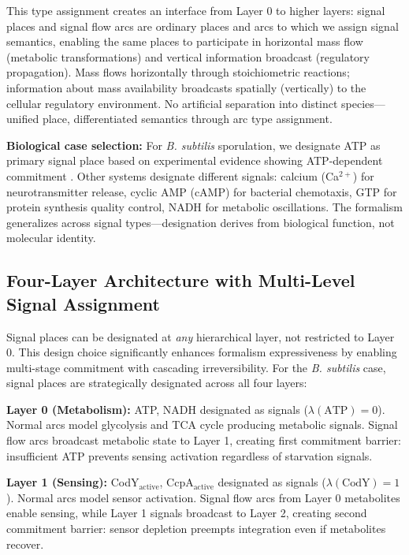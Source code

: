 \documentclass[10pt,letterpaper]{article}
\begin{document}
This type assignment creates an interface from Layer 0 to higher layers: signal places and signal flow arcs are ordinary places and arcs to which we assign signal semantics, enabling the same places to participate in horizontal mass flow (metabolic transformations) and vertical information broadcast (regulatory propagation). Mass flows horizontally through stoichiometric reactions; information about mass availability broadcasts spatially (vertically) to the cellular regulatory environment. No artificial separation into distinct species---unified place, differentiated semantics through arc type assignment.

\textbf{Biological case selection:} For \textit{B. subtilis} sporulation, we designate ATP as primary signal place based on experimental evidence showing ATP-dependent commitment \cite{fujita2005}. Other systems designate different signals: calcium (Ca$^{2+}$) for neurotransmitter release, cyclic AMP (cAMP) for bacterial chemotaxis, GTP for protein synthesis quality control, NADH for metabolic oscillations. The formalism generalizes across signal types---designation derives from biological function, not molecular identity.

\subsection{Four-Layer Architecture with Multi-Level Signal Assignment}

Signal places can be designated at \textit{any} hierarchical layer, not restricted to Layer 0. This design choice significantly enhances formalism expressiveness by enabling multi-stage commitment with cascading irreversibility. For the \textit{B. subtilis} case, signal places are strategically designated across all four layers:

\vspace{3pt}
\noindent\textbf{Layer 0 (Metabolism):} ATP, NADH designated as signals ($\lambda(\text{ATP}) = 0$). Normal arcs model glycolysis and TCA cycle producing metabolic signals. Signal flow arcs broadcast metabolic state to Layer 1, creating first commitment barrier: insufficient ATP prevents sensing activation regardless of starvation signals.

\vspace{3pt}
\noindent\textbf{Layer 1 (Sensing):} CodY$_{\text{active}}$, CcpA$_{\text{active}}$ designated as signals ($\lambda(\text{CodY}) = 1$). Normal arcs model sensor activation. Signal flow arcs from Layer 0 metabolites enable sensing, while Layer 1 signals broadcast to Layer 2, creating second commitment barrier: sensor depletion preempts integration even if metabolites recover.
\end{document}
